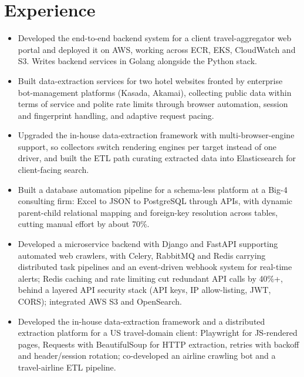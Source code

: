 \documentclass[10pt,a4paper]{article}
\begin{document}
\section{Experience}
\begin{itemize}
  \item Developed the end-to-end backend system for a client travel-aggregator web portal and deployed it on AWS, working across ECR, EKS, CloudWatch and S3. Writes backend services in Golang alongside the Python stack.
  \item Built data-extraction services for two hotel websites fronted by enterprise bot-management platforms (Kasada, Akamai), collecting public data within terms of service and polite rate limits through browser automation, session and fingerprint handling, and adaptive request pacing.
  \item Upgraded the in-house data-extraction framework with multi-browser-engine support, so collectors switch rendering engines per target instead of one driver, and built the ETL path curating extracted data into Elasticsearch for client-facing search.
\end{itemize}

\begin{itemize}
  \item Built a database automation pipeline for a schema-less platform at a Big-4 consulting firm: Excel to JSON to PostgreSQL through APIs, with dynamic parent-child relational mapping and foreign-key resolution across tables, cutting manual effort by about 70\%.
  \item Developed a microservice backend with Django and FastAPI supporting automated web crawlers, with Celery, RabbitMQ and Redis carrying distributed task pipelines and an event-driven webhook system for real-time alerts; Redis caching and rate limiting cut redundant API calls by 40\%+, behind a layered API security stack (API keys, IP allow-listing, JWT, CORS); integrated AWS S3 and OpenSearch.
  \item Developed the in-house data-extraction framework and a distributed extraction platform for a US travel-domain client: Playwright for JS-rendered pages, Requests with BeautifulSoup for HTTP extraction, retries with backoff and header/session rotation; co-developed an airline crawling bot and a travel-airline ETL pipeline.
\end{itemize}
\end{document}
